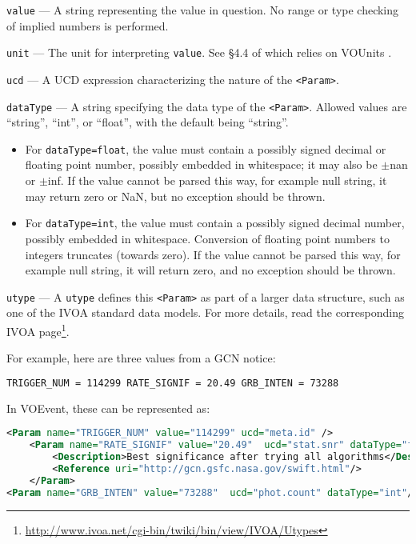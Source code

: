 \documentclass[11pt,a4paper]{ivoa}
\begin{document}
 {\tt value}\label{sec:3.3.1.2} --- A string representing
the value in question. No range or type checking of implied numbers is
performed.

 {\tt unit}\label{sec:3.3.1.3} --- The unit for
interpreting {\tt value}. See \S4.4 of \citep{2019ivoa.spec.1021O}
which relies on VOUnits \citep{2014ivoa.spec.0523D}.

 {\tt ucd}\label{sec:3.3.1.4} --- A UCD
\citep{2018ivoa.spec.0527P}
expression characterizing the nature of the {\tt <Param>}.

 {\tt dataType}\label{sec:3.3.1.5} --- A string specifying
the data type of the {\tt <Param>}. Allowed values are ``string'', ``int'', or
``float'', with the default being ``string''.
\begin{itemize}
\item For {\tt dataType=float}, the value must contain a possibly signed decimal
or floating point number, possibly embedded in whitespace; it may also be
$\pm$nan or $\pm$inf. If the value cannot be parsed this way, for example null
string, it may return zero or NaN, but no exception should be thrown.
\item For {\tt dataType=int}, the value must contain a possibly signed decimal
number, possibly embedded in whitespace. Conversion of floating point numbers to
integers truncates (towards zero). If the value cannot be parsed this way, for
example null string, it will return zero, and no exception should be thrown.
\end{itemize}

 {\tt utype}\label{sec:3.3.1.6} --- A {\tt utype} defines
this {\tt <Param>} as part of a larger data structure, such as one of the IVOA
standard data models. For more details, read the corresponding IVOA
page\footnote{\url{http://www.ivoa.net/cgi-bin/twiki/bin/view/IVOA/Utypes}}.

For example, here are three values from a GCN \citep{bib04} notice:
\begin{lstlisting}[language=XML]
TRIGGER_NUM = 114299 RATE_SIGNIF = 20.49 GRB_INTEN = 73288
\end{lstlisting}
In VOEvent, these can be represented as:
\begin{lstlisting}[language=XML]
<Param name="TRIGGER_NUM" value="114299" ucd="meta.id" />
    <Param name="RATE_SIGNIF" value="20.49"  ucd="stat.snr" dataType="float">
        <Description>Best significance after trying all algorithms</Description>
        <Reference uri="http://gcn.gsfc.nasa.gov/swift.html"/>
    </Param>
<Param name="GRB_INTEN" value="73288"  ucd="phot.count" dataType="int"/>
\end{lstlisting}
\end{document}
